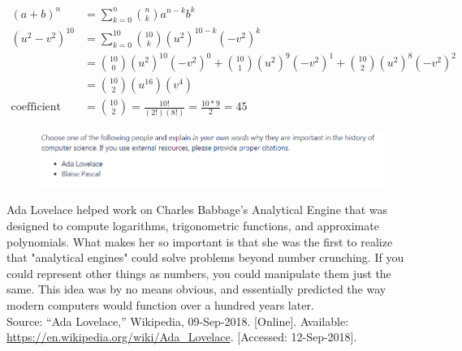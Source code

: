 \documentclass{article}
\begin{document}
\begin{large}
\begingroup
\addtolength{\jot}{1em}
\begin{align*}
    (a+b)^n &= \sum_{k=0}^{n} \binom{n}{k} a^{n-k}b^{k} \\
    (u^2-v^2)^{10} &= \sum_{k=0}^{10} \binom{10}{k} (u^2)^{10-k}(-v^2)^{k} \\
                   &= \binom{10}{0} (u^2)^{10}(-v^2)^{0} + \binom{10}{1} (u^2)^{9}(-v^2)^{1} 
                   + \boxed{\binom{10}{2} (u^2)^{8}(-v^2)^{2}} \\
                   &= \binom{10}{2} (u^{16})(v^4) \\
                   \text{coefficient} &= \binom{10}{2}
                   = \frac{10!}{(2!)(8!)}
                   = \frac{10*9}{2} = 45
\end{align*}
\endgroup

\clearpage
\header

\begin{figure}[h]
\includegraphics[scale = 1]{HW2Prob7}
\centering
\end{figure}

Ada Lovelace helped work on Charles Babbage's Analytical Engine that was designed to compute logarithms, trigonometric functions, and approximate polynomials. What makes her so important is that she was the first to realize that "analytical engines" could solve problems beyond number crunching. If you could represent other things as numbers, you could manipulate them just the same. This idea was by no means obvious, and essentially predicted the way modern computers would function over a hundred years later. \\


Source: “Ada Lovelace,” Wikipedia, 09-Sep-2018. [Online]. Available: \url{https://en.wikipedia.org/wiki/Ada_Lovelace}. [Accessed: 12-Sep-2018].


\end{large}
\end{document}
